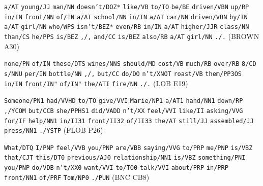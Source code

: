 \begin{exe}
\ex 
\begin{xlist} 
\label{ex:postagsets}
\ex \begin{minipage}[t]{0.85\textwidth} \raggedright  \texttt{a/AT} \texttt{young/JJ} \texttt{man/NN} \texttt{doesn't/DOZ*} \texttt{like/VB} \texttt{to/TO} \texttt{be/BE} \texttt{driven/VBN} \texttt{up/RP} \texttt{in/IN} \texttt{front/NN} \texttt{of/IN} \texttt{a/AT} \texttt{school/NN} \texttt{in/IN} \texttt{a/AT} \texttt{car/NN} \texttt{driven/VBN} \texttt{by/IN} \texttt{a/AT} \texttt{girl/NN} \texttt{who/WPS} \texttt{isn't/BEZ*} \texttt{even/RB} \texttt{in/IN} \texttt{a/AT} \texttt{higher/JJR} \texttt{class/NN} \texttt{than/CS} \texttt{he/PPS} \texttt{is/BEZ} \texttt{,/,} \texttt{and/CC} \texttt{is/BEZ} \texttt{also/RB} \texttt{a/AT} \texttt{girl/NN} \texttt{./.} (BROWN A30) \end{minipage}
\ex \begin{minipage}[t]{0.85\textwidth} \raggedright  \texttt{none/PN} \texttt{of/IN} \texttt{these/DTS} \texttt{wines/NNS} \texttt{should/MD} \texttt{cost/VB} \texttt{much/RB} \texttt{over/RB} \texttt{8/CD} \texttt{s/NNU} \texttt{per/IN} \texttt{bottle/NN} \texttt{,/,} \texttt{but/CC} \texttt{do/DO} \texttt{n't/XNOT} \texttt{roast/VB} \texttt{them/PP3OS} \texttt{in/IN} \texttt{front/IN"} \texttt{of/IN"} \texttt{the/ATI} \texttt{fire/NN} \texttt{./.} (LOB E19) \end{minipage}
\ex \begin{minipage}[t]{0.85\textwidth} \raggedright  \texttt{Someone/PN1} \texttt{had/VVHD} \texttt{to/TO} \texttt{give/VVI} \texttt{Marie/NP1} \texttt{a/AT1} \texttt{hand/NN1} \texttt{down/RP} \texttt{,/YCOM} \texttt{but/CCB} \texttt{she/PPHS1} \texttt{did/VADD} \texttt{n't/XX} \texttt{feel/VVI} \texttt{like/II} \texttt{asking/VVG} \texttt{for/IF} \texttt{help/NN1} \texttt{in/II31} \texttt{front/II32} \texttt{of/II33} \texttt{the/AT} \texttt{still/JJ} \texttt{assembled/JJ} \texttt{press/NN1} \texttt{./YSTP} (FLOB P26) \end{minipage}
\ex \begin{minipage}[t]{0.85\textwidth} \raggedright  \texttt{What/DTQ} \texttt{I/PNP} \texttt{feel/VVB} \texttt{you/PNP} \texttt{are/VBB} \texttt{saying/VVG} \texttt{to/PRP} \texttt{me/PNP} \texttt{is/VBZ} \texttt{that/CJT} \texttt{this/DT0} \texttt{previous/AJ0} \texttt{relationship/NN1} \texttt{is/VBZ} \texttt{something/PNI} \texttt{you/PNP} \texttt{do/VDB} \texttt{n't/XX0} \texttt{want/VVI} \texttt{to/TO0} \texttt{talk/VVI} \texttt{about/PRP} \texttt{in/PRP} \texttt{front/NN1} \texttt{of/PRF} \texttt{Tom/NP0} \texttt{./PUN} (BNC CB8) \end{minipage}
\end{xlist}
\end{exe}


